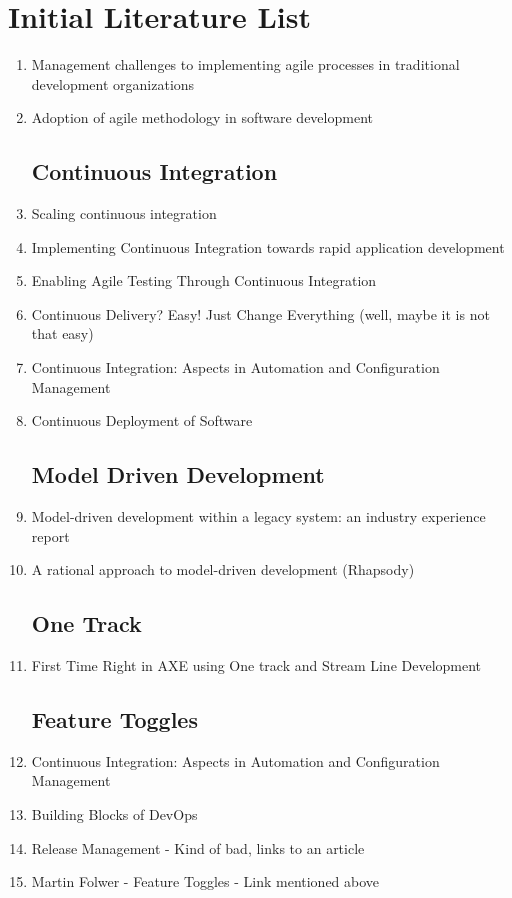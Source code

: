 \documentclass[ProjectPlan_innit.tex]{subfiles}
\begin{document}
\section{Initial Literature List}

\begin{enumerate}
\subsection{Changing to Agile}
\item Management challenges to implementing agile processes in traditional development organizations 
\item Adoption of agile methodology in software development

\subsection{Continuous Integration}
\item Scaling continuous integration
\item Implementing Continuous Integration towards rapid application development
\item Enabling Agile Testing Through Continuous Integration 
\item Continuous Delivery? Easy! Just Change Everything (well, maybe it is not that easy)
\item Continuous Integration: Aspects in Automation and Configuration Management
\item Continuous Deployment of Software

\subsection{Model Driven Development}
\item Model-driven development within a legacy system: an industry experience report
\item A rational approach to model-driven development (Rhapsody)

\subsection{One Track}
\item First Time Right in AXE using One track and Stream Line Development 

\subsection{Feature Toggles}
\item Continuous Integration: Aspects in Automation and Configuration Management
\item Building Blocks of DevOps
\item Release Management - Kind of bad, links to an article
\item Martin Folwer - Feature Toggles - Link mentioned above


\end{enumerate}
\end{document}
